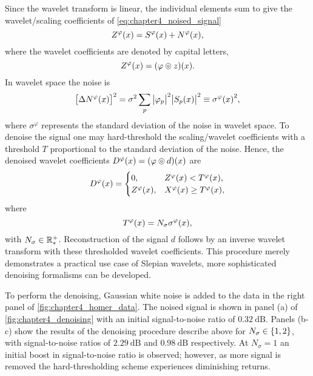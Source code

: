 Since the wavelet transform is linear, the individual elements sum to give the wavelet/scaling coefficients of \cref{eq:chapter4_noised_signal}
%
\begin{equation}
	Z^{\varphi}(x)
	= S^{\varphi}(x) + N^{\varphi}(x),
\end{equation}
%
where the wavelet coefficients are denoted by capital letters, \ie{}
%
\begin{equation}
	Z^{\varphi}(x) = (\varphi \circledcirc{} z)(x).
\end{equation}
%
In wavelet space the noise is
%
%
\begin{equation}
	{\big[\Delta N^{\varphi}(x)\big]}^{2}
	= \sigma^{2} \sum\limits_{p} \big\lvert{\varphi}_{p}\big\rvert^{2} \big\lvert{S}_{p}(x)\big\rvert^{2}
	\equiv {\sigma^{\varphi}(x)}^{2},
\end{equation}
%
where \(\sigma^{\varphi}\) represents the standard deviation of the noise in wavelet space.
To denoise the signal one may hard-threshold the scaling/wavelet coefficients with a threshold \(T\) proportional to the standard deviation of the noise.
Hence, the denoised wavelet coefficients \(D^{\varphi}(x) = (\varphi \circledcirc{} d)(x)\) are
%
\begin{equation}
	D^{\varphi}(x) =
	\begin{cases}
		0,
		 & Z^{\varphi}(x) < T^{\varphi}(x),    \\
		Z^{\varphi}(x),
		 & X^{\varphi}(x) \geq T^{\varphi}(x),
	\end{cases}
\end{equation}
%
where
%
\begin{equation}
	T^{\varphi}(x)
	= N_{\sigma}\sigma^{\varphi}(x),
\end{equation}
%
with \(N_{\sigma} \in \mathbb{R}_{\ast}^{+}{}\).
Reconstruction of the signal \(d\) follows by an inverse wavelet transform with these thresholded wavelet coefficients.
This procedure merely demonstrates a practical use case of Slepian wavelets, more sophisticated denoising formalisms can be developed.

To perform the denoising, Gaussian white noise is added to the data in the right panel of \cref{fig:chapter4_homer_data}.
The noised signal is shown in panel (a) of \cref{fig:chapter4_denoising} with an initial signal-to-noise ratio of \(\SI{0.32}{\dB}\).
Panels (b-c) show the results of the denoising procedure describe above for \(N_{\sigma} \in \{1,2\}\), with signal-to-noise ratios of \(\SI{2.29}{\dB}\) and \(\SI{0.98}{\dB}\) respectively.
At \(N_{\sigma}=1\) an initial boost in signal-to-noise ratio is observed; however, as more signal is removed the hard-thresholding scheme experiences diminishing returns.

